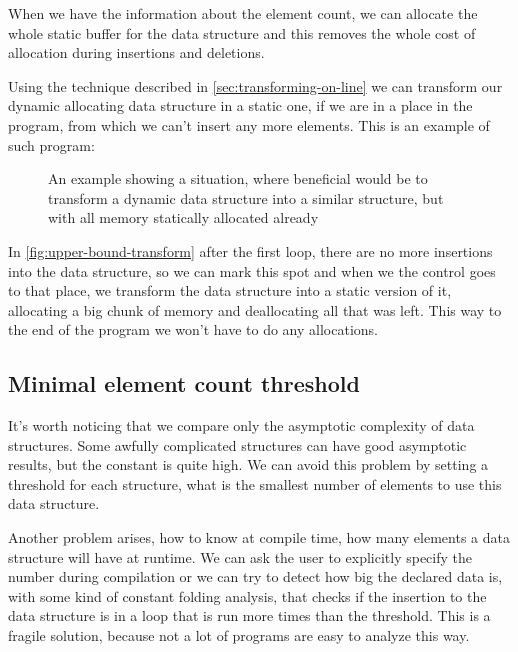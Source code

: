 \documentclass[a4paper,11pt]{article}
\begin{document}
		When we have the information about the element count, we can allocate the whole static buffer for the
		data structure and this removes the whole cost of allocation during insertions and deletions.

		Using the technique described in \autoref{sec:transforming-on-line} we can transform our dynamic
		allocating data structure in a static one, if we are in a place in the program, from which we can't
		insert any more elements. This is an example of such program:

		\begin{figure}
			

			\caption{An example showing a situation, where beneficial would be to transform a dynamic data
			structure into a similar structure, but with all memory statically allocated already}

			\label{fig:upper-bound-transform}
		\end{figure}

		In \autoref{fig:upper-bound-transform} after the first loop, there are no more insertions into the data
		structure, so we can mark this spot and when we the control goes to that place, we transform the data
		structure into a static version of it, allocating a big chunk of memory and deallocating all that was
		left. This way to the end of the program we won't have to do any allocations.

	\subsection{Minimal element count threshold}

		It's worth noticing that we compare only the asymptotic complexity of data structures. Some awfully
		complicated structures can have good asymptotic results, but the constant is quite high. We can avoid
		this problem by setting a threshold for each structure, what is the smallest number of elements to use
		this data structure.

		Another problem arises, how to know at compile time, how many elements a data structure will have at
		runtime. We can ask the user to explicitly specify the number during compilation or we can try to
		detect how big the declared data is, with some kind of constant folding analysis, that checks if the
		insertion to the data structure is in a loop that is run more times than the threshold. This is a fragile
		solution, because not a lot of programs are easy to analyze this way.
\end{document}
